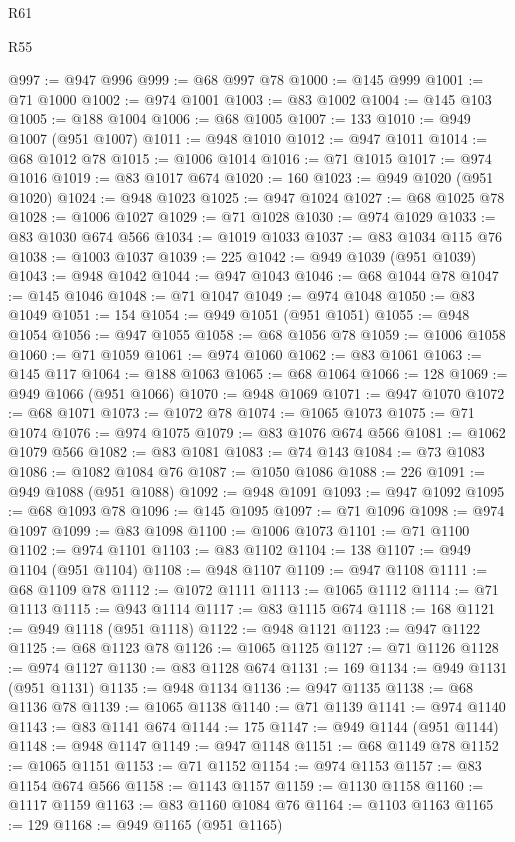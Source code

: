 \begin{lexlean}{R61}
\begin{lexlean}{R55}
\begin{coremodule}
{{{{{{{{{{{{{{{{{{{{{{{{{{{{{{{{{{{{{{{{{{{{{{{{{{{{{{{{{{{{{{@997 := @947 @996
@999 := @68 @997 @78
@1000 := @145 @999
@1001 := @71 @1000
@1002 := @974 @1001
@1003 := @83 @1002
@1004 := @145 @103
@1005 := @188 @1004
@1006 := @68 @1005
@1007 := 133
@1010 := @949 @1007 (@951 @1007)
@1011 := @948 @1010
@1012 := @947 @1011
@1014 := @68 @1012 @78
@1015 := @1006 @1014
@1016 := @71 @1015
@1017 := @974 @1016
@1019 := @83 @1017 @674
@1020 := 160
@1023 := @949 @1020 (@951 @1020)
@1024 := @948 @1023
@1025 := @947 @1024
@1027 := @68 @1025 @78
@1028 := @1006 @1027
@1029 := @71 @1028
@1030 := @974 @1029
@1033 := @83 @1030 @674 @566
@1034 := @1019 @1033
@1037 := @83 @1034 @115 @76
@1038 := @1003 @1037
@1039 := 225
@1042 := @949 @1039 (@951 @1039)
@1043 := @948 @1042
@1044 := @947 @1043
@1046 := @68 @1044 @78
@1047 := @145 @1046
@1048 := @71 @1047
@1049 := @974 @1048
@1050 := @83 @1049
@1051 := 154
@1054 := @949 @1051 (@951 @1051)
@1055 := @948 @1054
@1056 := @947 @1055
@1058 := @68 @1056 @78
@1059 := @1006 @1058
@1060 := @71 @1059
@1061 := @974 @1060
@1062 := @83 @1061
@1063 := @145 @117
@1064 := @188 @1063
@1065 := @68 @1064
@1066 := 128
@1069 := @949 @1066 (@951 @1066)
@1070 := @948 @1069
@1071 := @947 @1070
@1072 := @68 @1071
@1073 := @1072 @78
@1074 := @1065 @1073
@1075 := @71 @1074
@1076 := @974 @1075
@1079 := @83 @1076 @674 @566
@1081 := @1062 @1079 @566
@1082 := @83 @1081
@1083 := @74 @143
@1084 := @73 @1083
@1086 := @1082 @1084 @76
@1087 := @1050 @1086
@1088 := 226
@1091 := @949 @1088 (@951 @1088)
@1092 := @948 @1091
@1093 := @947 @1092
@1095 := @68 @1093 @78
@1096 := @145 @1095
@1097 := @71 @1096
@1098 := @974 @1097
@1099 := @83 @1098
@1100 := @1006 @1073
@1101 := @71 @1100
@1102 := @974 @1101
@1103 := @83 @1102
@1104 := 138
@1107 := @949 @1104 (@951 @1104)
@1108 := @948 @1107
@1109 := @947 @1108
@1111 := @68 @1109 @78
@1112 := @1072 @1111
@1113 := @1065 @1112
@1114 := @71 @1113
@1115 := @943 @1114
@1117 := @83 @1115 @674
@1118 := 168
@1121 := @949 @1118 (@951 @1118)
@1122 := @948 @1121
@1123 := @947 @1122
@1125 := @68 @1123 @78
@1126 := @1065 @1125
@1127 := @71 @1126
@1128 := @974 @1127
@1130 := @83 @1128 @674
@1131 := 169
@1134 := @949 @1131 (@951 @1131)
@1135 := @948 @1134
@1136 := @947 @1135
@1138 := @68 @1136 @78
@1139 := @1065 @1138
@1140 := @71 @1139
@1141 := @974 @1140
@1143 := @83 @1141 @674
@1144 := 175
@1147 := @949 @1144 (@951 @1144)
@1148 := @948 @1147
@1149 := @947 @1148
@1151 := @68 @1149 @78
@1152 := @1065 @1151
@1153 := @71 @1152
@1154 := @974 @1153
@1157 := @83 @1154 @674 @566
@1158 := @1143 @1157
@1159 := @1130 @1158
@1160 := @1117 @1159
@1163 := @83 @1160 @1084 @76
@1164 := @1103 @1163
@1165 := 129
@1168 := @949 @1165 (@951 @1165)
}}}}}}}}}}}}}}}}}}}}}}}}}}}}}}}}}}}}}}}}}}}}}}}}}}}}}}}}}}}}}}
\end{coremodule}
\end{lexlean}
\end{lexlean}
